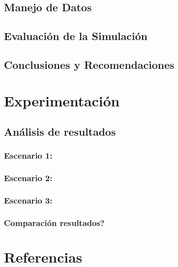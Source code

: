 \documentclass{article}
\begin{document}
\subsection{Manejo de Datos}

\subsection{Evaluación de la Simulación}


\subsection{Conclusiones y Recomendaciones}



\section{Experimentación}\label{sec:exp}

\subsection{Análisis de resultados}

\subsubsection{Escenario 1: }

\subsubsection{Escenario 2: }
 
\subsubsection{Escenario 3: }

\subsubsection{Comparación resultados?}



\section{Referencias}
\renewcommand{\refname}{}
\end{document}
